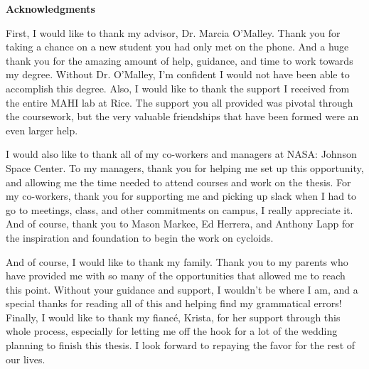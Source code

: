 \begin{center}
\large
\textbf{Acknowledgments}
\end{center}

First, I would like to thank my advisor, Dr. Marcia O'Malley. Thank you for taking a chance on a new student you had only met on the phone. And a huge thank you for the amazing amount of help, guidance, and time to work towards my degree. Without Dr. O'Malley, I'm confident I would not have been able to accomplish this degree. Also, I would like to thank the support I received from the entire MAHI lab at Rice. The support you all provided was pivotal through the coursework, but the very valuable friendships that have been formed were an even larger help. 

I would also like to thank all of my co-workers and managers at NASA: Johnson Space Center. To my managers, thank you for helping me set up this opportunity, and allowing me the time needed to attend courses and work on the thesis. For my co-workers, thank you for supporting me and picking up slack when I had to go to meetings, class, and other commitments on campus, I really appreciate it. And of course, thank you to Mason Markee, Ed Herrera, and Anthony Lapp for the inspiration and foundation to begin the work on cycloids. 

And of course, I would like to thank my family. Thank you to my parents who have provided me with so many of the opportunities that allowed me to reach this point. Without your guidance and support, I wouldn't be where I am, and a special thanks for reading all of this and helping find my grammatical errors!
Finally, I would like to thank my fianc\'e, Krista, for her support through this whole process, especially for letting me off the hook for a lot of the wedding planning to finish this thesis. I look forward to repaying the favor for the rest of our lives. 